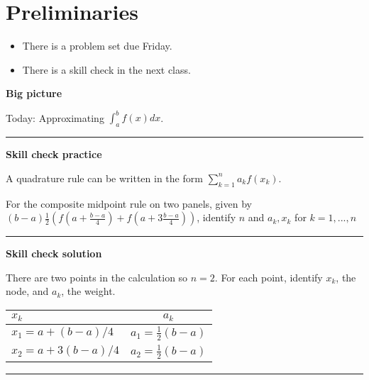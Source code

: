 \documentclass[12pt,letterpaper,noanswers]{exam}
\begin{document}
 \pdfpageheight 11in 
  \pdfpagewidth 8.5in

\noindent 

\section*{Preliminaries}

\begin{itemize}
\itemsep0pt
\item There is a problem set due Friday.
\item There is a skill check in the next class.
\end{itemize}


\noindent\textbf{Big picture}

Today: Approximating $\int_{a}^{b}f(x)dx$.

\vspace{0.2cm}
\hrule
\vspace{0.2cm}

\noindent \textbf{Skill check practice}

 A quadrature rule can be written in the form $\sum\limits_{k=1}^n a_k f(x_k)$.

For the composite midpoint rule on two panels, given by $(b-a)\frac{1}{2}\left(f(a + \frac{b-a}{4})+ f(a + 3\frac{b-a}{4})\right)$, identify $n$ and $a_k, x_k$ for $k=1,...,n$




\vspace{0.2cm}
\hrule
\vspace{0.2cm}

\noindent \textbf{Skill check solution}

There are two points in the calculation so $n = 2$.  For each point, identify $x_k$, the node, and $a_k$, the weight.

\begin{tabular}{| l|  c|}
\hline
$x_k$ & $a_k$ \\
\hline
$x_1 = a+(b-a)/4$ & $a_1 = \frac{1}{2}(b-a)$ \\
$x_2 = a+3(b-a)/4$ & $a_2 = \frac{1}{2}(b-a)$ \\
\hline
\end{tabular}


\vspace{0.2cm}
\hrule
\vspace{0.2cm}
\end{document}
